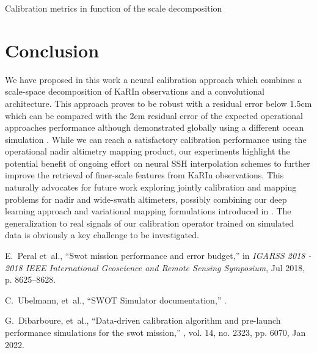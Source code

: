 \begin{bibunit}
\begin{table}[!t]
\begin{center}
	
\end{center}
\caption{Calibration metrics in function of the scale decomposition}
\label{table:scale_dec}
\end{table}

\section{Conclusion}
\label{sec:conclusion}
\noindent
We have proposed in this work a neural calibration approach which combines a scale-space decomposition of KaRIn observations and a convolutional architecture. This approach proves to be robust with a 
residual error below 1.5cm which can be compared with the 2cm residual error of the expected operational approaches performance although demonstrated globally using a different ocean simulation \cite{Dibarboure_Ubelmann_Flamant_Briol_Peral_Bracher_Vergara_Faugere_Soulat_Picot_2022}. While we can reach a satisfactory calibration performance using the operational nadir altimetry mapping product, our experiments highlight the potential benefit of ongoing effort on neural SSH interpolation schemes to further improve the retrieval of finer-scale features from KaRIn observations.
This naturally advocates for future work exploring jointly calibration and mapping problems for nadir and wide-swath altimeters, possibly combining our deep learning approach and variational mapping formulations introduced in \cite{Febvre_Fablet_Sommer_Ubelmann_2022}.
The generalization to real signals of our calibration operator trained on simulated data is obviously a key challenge to be investigated.

% 
% 
\begin{thebibliography}{10}

E.~Peral et~al.,
\newblock ``Swot mission performance and error budget,''
\newblock in {\em IGARSS 2018 - 2018 IEEE International Geoscience and Remote
  Sensing Symposium}, Jul 2018, p. 8625–8628.

C.~Ubelmann, et~al.,
\newblock ``{SWOT} {Simulator} documentation,'' .

G.~Dibarboure, et~al.,
\newblock ``Data-driven calibration algorithm and pre-launch performance
  simulations for the swot mission,''
, vol. 14, no. 2323, pp. 6070, Jan 2022.


\end{thebibliography}
\end{bibunit}
